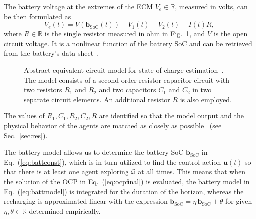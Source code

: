 \documentclass[letterpaper,10pt,conference,twoside]{IEEEtran}
\theoremstyle{definition}
\begin{document}
The battery voltage at the extremes of the ECM $V_e\in\mathbb{R}$, measured in volts, can be then formulated as~\cite{zhao2017observability}
\begin{equation}
  V_e(t)=V(\mathbf{b}_{\text{SoC}}(t))-V_1(t)-V_2(t)-I(t)R,
\end{equation}
where $R\in\mathbb{R}$ is the single resistor measured in ohm in Fig.~\ref{fig:thevenin}, and $V$ is the open circuit voltage. It is a nonlinear function of the battery SoC and can be retrieved from the battery's data sheet~\cite{hinz2019comparison}.

\begin{figure}[t!]
  \vspace*{-.2cm}
  \begin{minipage}[c]{.43\columnwidth}
    \vspace*{.24cm}
    \caption{Abstract equivalent circuit model for state-of-charge estimation~\cite{seewaldphdthesis}. The model consists of a second-order resistor-capacitor circuit with two resistors $R_1$ and $R_2$ and two capacitors $C_1$ and $C_2$ in two separate circuit elements. An additional resistor $R$ is also employed. %
    } 
    \label{fig:thevenin}
  \end{minipage}
  \begin{minipage}[c]{.57\columnwidth}
    \centering
    \vspace*{-.1cm}
    
  \end{minipage}
  \vspace*{-.6cm}
\end{figure}

The values of $R_1,C_1,R_2,C_2,R$ are identified so that the model output and the physical behavior of the agents are matched as closely as possible~\cite{zhao2017observability} (see Sec.~\ref{sec:res}).

The battery model allows us to determine the battery SoC $\mathbf{b}_{\text{SoC}}$ in Eq.~(\ref{eq:battconst}), which is in turn utilized to find the control action $\mathbf{u}(t)$ so that there is at least one agent exploring $\mathcal{Q}$ at all times. This means that when the solution of the OCP in Eq.~(\ref{eq:ocpfinal}) is evaluated, the battery model in Eq.~(\ref{eq:battmodel}) is integrated for the duration of the horizon, whereas the recharging is approximated linear with the expression $\mathbf{b}_{\text{SoC}}=\eta\,\mathbf{b}_{\text{SoC}}+\theta$ for given $\eta,\theta\in\mathbb{R}$ determined empirically.
\end{document}
